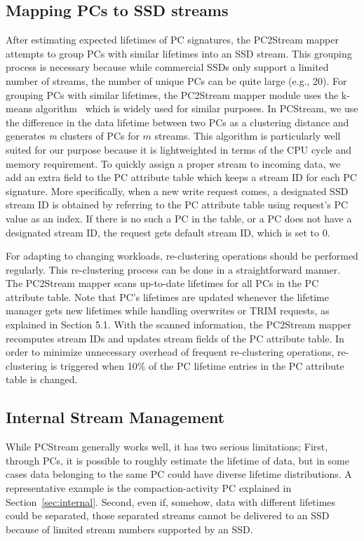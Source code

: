 \subsection{Mapping PCs to SSD streams}

After estimating expected lifetimes of PC signatures, the PC2Stream mapper 
attempts to group PCs with similar lifetimes into an SSD stream.  This grouping
process is necessary because while commercial SSDs only support a limited number
of streams, the number of unique PCs can be quite large (e.g., 20).  
For grouping PCs with similar lifetimes, the PC2Stream mapper module uses the k-means
algorithm~\cite{kmeans} which is widely used for similar purposes.  
{\color{blue}
In PCStream, we use the difference in the data lifetime between two PCs 
as a clustering distance and  generates {\it m} clusters of PCs for $m$ streams.
This algorithm is particularly well suited for our purpose because 
it is lightweighted in terms of the CPU cycle and memory requirement.
}
To quickly assign a proper stream to incoming data, we add an extra field to the
PC attribute table which keeps a stream ID for each PC signature.  More
specifically, when a new write request comes, a designated SSD stream ID is
obtained by referring to the PC attribute table using request's PC value as an
index.  If there is no such a PC in the table, or a PC does not have a
designated stream ID, the request gets default stream ID, which is set to 0.

For adapting to changing workloads, re-clustering operations should be
performed regularly. This re-clustering process can be done in a
straightforward manner. The PC2Stream mapper scans up-to-date lifetimes for
all PCs in the PC attribute table. Note that PC's lifetimes are updated whenever
the lifetime manager gets new lifetimes while handling overwrites or TRIM requests,
as explained in Section 5.1.  With the scanned information, the PC2Stream mapper
recomputes stream IDs and updates stream fields of the PC attribute table.
In order to minimize unnecessary overhead of frequent re-clustering operations, 
re-clustering is triggered when 10\% of the PC lifetime entries in the PC attribute
table is changed.



\subsection{Internal Stream Management}
While \textsf{PCStream} generally works well, it has two serious limitations;
First, through PCs, it is possible to roughly estimate the lifetime of data,
but in some cases data belonging to the same PC could have diverse lifetime
distributions.  A representative example is the compaction-activity PC
explained in Section~\ref{sec:internal}. Second, even if, somehow, data with different lifetimes
could be separated, those separated streams cannot be delivered to an SSD
because of limited stream numbers supported by an SSD.

